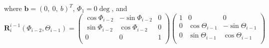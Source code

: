 \documentclass[a4paper,10pt]{article}
\begin{document}
where $\textbf{b}=(0,\ 0,\ b)^T$, $\Phi_1=0\deg$, and
\begin{equation}\label{eq:r_matrix}
\textbf{R}^{i-1}_{i}\left(\Phi_{i-2},\Theta_{i-1}\right)=
\begin{pmatrix}
\cos\Phi_{i-2} & -\sin\Phi_{i-2} & 0 \\
\sin\Phi_{i-2} & \cos\Phi_{i-2} & 0 \\
0 & 0 & 1 \\
\end{pmatrix}
\begin{pmatrix}
1 & 0 & 0 \\
0 & \cos\Theta_{i-1} & -\sin\Theta_{i-1} \\
0 & \sin\Theta_{i-1} & \cos\Theta_{i-1} \\
\end{pmatrix}
\end{equation}
\end{document}

